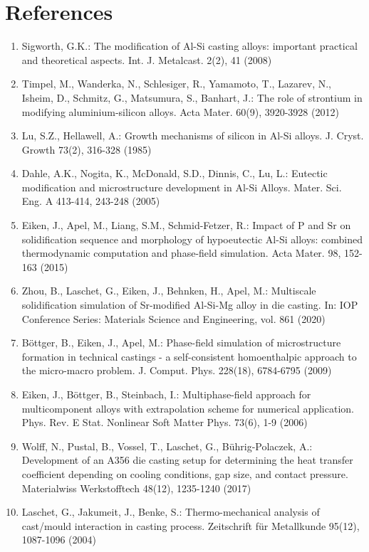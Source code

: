 \documentclass[10pt]{article}
\begin{document}
\section*{References}
\begin{enumerate}
  \item Sigworth, G.K.: The modification of Al-Si casting alloys: important practical and theoretical aspects. Int. J. Metalcast. 2(2), 41 (2008)

  \item Timpel, M., Wanderka, N., Schlesiger, R., Yamamoto, T., Lazarev, N., Isheim, D., Schmitz, G., Matsumura, S., Banhart, J.: The role of strontium in modifying aluminium-silicon alloys. Acta Mater. 60(9), 3920-3928 (2012)

  \item Lu, S.Z., Hellawell, A.: Growth mechanisms of silicon in Al-Si alloys. J. Cryst. Growth 73(2), 316-328 (1985)

  \item Dahle, A.K., Nogita, K., McDonald, S.D., Dinnis, C., Lu, L.: Eutectic modification and microstructure development in Al-Si Alloys. Mater. Sci. Eng. A 413-414, 243-248 (2005)

  \item Eiken, J., Apel, M., Liang, S.M., Schmid-Fetzer, R.: Impact of $\mathrm{P}$ and $\mathrm{Sr}$ on solidification sequence and morphology of hypoeutectic Al-Si alloys: combined thermodynamic computation and phase-field simulation. Acta Mater. 98, 152-163 (2015)

  \item Zhou, B., Laschet, G., Eiken, J., Behnken, H., Apel, M.: Multiscale solidification simulation of Sr-modified Al-Si-Mg alloy in die casting. In: IOP Conference Series: Materials Science and Engineering, vol. 861 (2020)

  \item Böttger, B., Eiken, J., Apel, M.: Phase-field simulation of microstructure formation in technical castings - a self-consistent homoenthalpic approach to the micro-macro problem. J. Comput. Phys. 228(18), 6784-6795 (2009)

  \item Eiken, J., Böttger, B., Steinbach, I.: Multiphase-field approach for multicomponent alloys with extrapolation scheme for numerical application. Phys. Rev. E Stat. Nonlinear Soft Matter Phys. 73(6), 1-9 (2006)

  \item Wolff, N., Pustal, B., Vossel, T., Laschet, G., Bührig-Polaczek, A.: Development of an A356 die casting setup for determining the heat transfer coefficient depending on cooling conditions, gap size, and contact pressure. Materialwiss Werkstofftech 48(12), 1235-1240 (2017)

  \item Laschet, G., Jakumeit, J., Benke, S.: Thermo-mechanical analysis of cast/mould interaction in casting process. Zeitschrift für Metallkunde 95(12), 1087-1096 (2004)

\end{enumerate}
\end{document}
